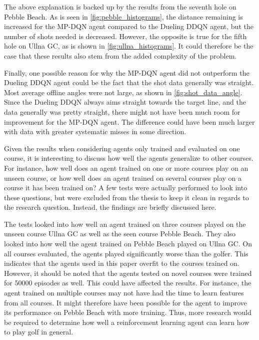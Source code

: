 \documentclass{kththesis}
\begin{document}
The above explanation is backed up by the results from the seventh hole on Pebble Beach. As is seen in \autoref{fig:pebble_histograms}, the distance remaining is increased for the MP-DQN agent compared to the Dueling DDQN agent, but the number of shots needed is decreased. However, the opposite is true for the fifth hole on Ullna GC, as is shown in \autoref{fig:ullna_histograms}. It could therefore be the case that these results also stem from the added complexity of the problem.

Finally, one possible reason for why the MP-DQN agent did not outperform the Dueling DDQN agent could be the fact that the shot data generally was straight. Most average offline angles were not large, as shown in \autoref{fig:shot_data_angle}. Since the Dueling DDQN always aims straight towards the target line, and the data generally was pretty straight, there might not have been much room for improvement for the MP-DQN agent. The difference could have been much larger with data with greater systematic misses in some direction.

Given the results when considering agents only trained and evaluated on one course, it is interesting to discuss how well the agents generalize to other courses. For instance, how well does an agent trained on one or more courses play on an unseen course, or how well does an agent trained on several courses play on a course it has been trained on? A few tests were actually performed to look into these questions, but were excluded from the thesis to keep it clean in regards to the research question. Instead, the findings are briefly discussed here.

The tests looked into how well an agent trained on three courses played on the unseen course Ullna GC as well as the seen course Pebble Beach. They also looked into how well the agent trained on Pebble Beach played on Ullna GC. On all courses evaluated, the agents played significantly worse than the golfer. This indicates that the agents used in this paper overfit to the courses trained on. However, it should be noted that the agents tested on novel courses were trained for 50000 episodes as well. This could have affected the results. For instance, the agent trained on multiple courses may not have had the time to learn features from all courses. It might therefore have been possible for the agent to improve its performance on Pebble Beach with more training. Thus, more research would be required to determine how well a reinforcement learning agent can learn how to play golf in general.
\end{document}
